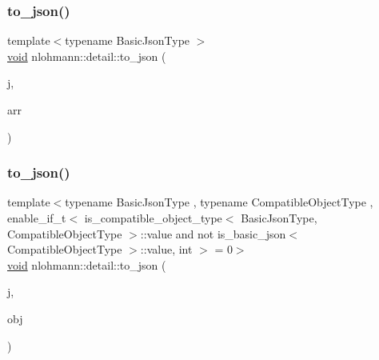 \mbox{\label{namespacenlohmann_1_1detail_aa0fd1b5788e9ba37e31da43dda738cb5}} 
\subsubsection{\texorpdfstring{to\_json()}{to\_json()}\hspace{0.1cm}{\footnotesize\ttfamily [11/17]}}
{\footnotesize\ttfamily template$<$typename Basic\+Json\+Type $>$ \\
\mbox{\hyperlink{namespacenlohmann_1_1detail_a59fca69799f6b9e366710cb9043aa77d}{void}} nlohmann\+::detail\+::to\+\_\+json (\begin{DoxyParamCaption}\item[{Basic\+Json\+Type \&}]{j,  }\item[{typename Basic\+Json\+Type\+::array\+\_\+t \&\&}]{arr }\end{DoxyParamCaption})}

\mbox{\label{namespacenlohmann_1_1detail_a24c9c12f3839c94e09532f08de85e949}} 
\subsubsection{\texorpdfstring{to\_json()}{to\_json()}\hspace{0.1cm}{\footnotesize\ttfamily [12/17]}}
{\footnotesize\ttfamily template$<$typename Basic\+Json\+Type , typename Compatible\+Object\+Type , enable\+\_\+if\+\_\+t$<$ is\+\_\+compatible\+\_\+object\+\_\+type$<$ Basic\+Json\+Type, Compatible\+Object\+Type $>$\+::value and not is\+\_\+basic\+\_\+json$<$ Compatible\+Object\+Type $>$\+::value, int $>$  = 0$>$ \\
\mbox{\hyperlink{namespacenlohmann_1_1detail_a59fca69799f6b9e366710cb9043aa77d}{void}} nlohmann\+::detail\+::to\+\_\+json (\begin{DoxyParamCaption}\item[{Basic\+Json\+Type \&}]{j,  }\item[{const Compatible\+Object\+Type \&}]{obj }\end{DoxyParamCaption})}

\mbox{\label{namespacenlohmann_1_1detail_ac9f7a5542851c61d93740148eaec509f}} 
